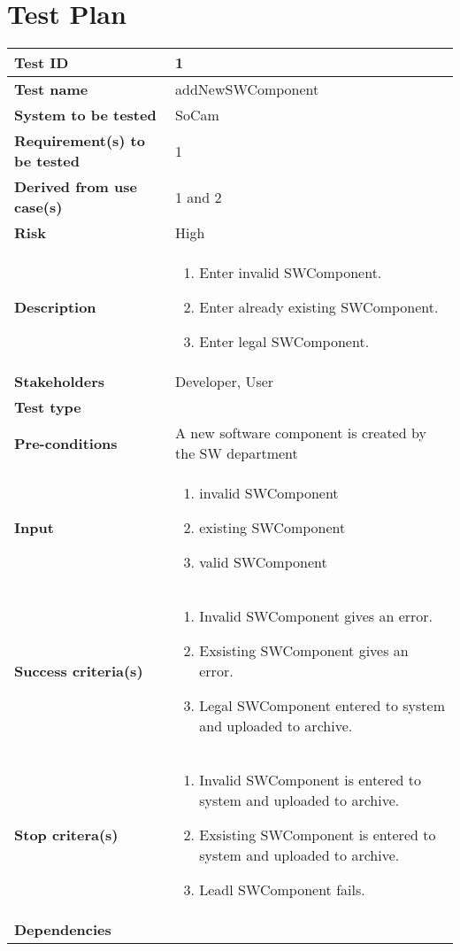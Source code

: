 \chapter{Test Plan}

\clearpage

		\begin{table}[H]
			\begin{tabular}{| p{4cm} | p{10cm} |}
			\hline
			\rowcolor{gray}
				{\bf Test ID} & 1 \\ \hline
				{\bf Test name} & addNewSWComponent \\ \hline
				{\bf System to be tested} & SoCam \\ \hline
				{\bf Requirement(s) to be tested} & 1 \\ \hline
				{\bf Derived from use case(s)} & 1 and 2 \\ \hline
				{\bf Risk} & High \\ \hline
				{\bf Description} & 
					\begin{enumerate}
						\item Enter invalid SWComponent.
						\item Enter already existing SWComponent.
						\item Enter legal SWComponent.
					\end{enumerate}
				\\ \hline
				{\bf Stakeholders} & Developer, User \\ \hline
				{\bf Test type} & \\ \hline
				{\bf Pre-conditions} & A new software component is created by the 
				SW department\\ \hline
				{\bf Input} & 
					\begin{enumerate}
						\item invalid SWComponent
						\item existing SWComponent
						\item valid SWComponent
					\end{enumerate}
				\\ \hline
				{\bf Success criteria(s)} & 
					\begin{enumerate}
						\item Invalid SWComponent gives an error.
						\item Exsisting SWComponent gives an error.
						\item Legal SWComponent entered to system and uploaded to archive.
					\end{enumerate}
				\\ \hline
				{\bf Stop critera(s)} &  
					\begin{enumerate}
						\item Invalid SWComponent is entered to system and uploaded to archive.
						\item Exsisting SWComponent is entered to system and uploaded to archive.
						\item Leadl SWComponent fails.
					\end{enumerate} \\ \hline
				{\bf Dependencies} & \\ \hline
			\end{tabular}
		\end{table}

